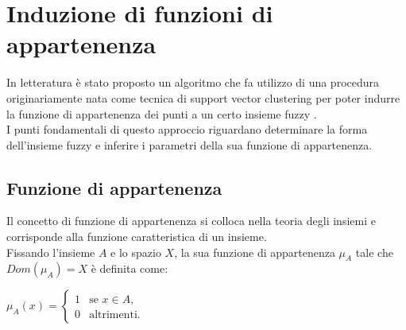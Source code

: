 \documentclass[12pt]{report}
\theoremstyle{definition}
\begin{document}
\section{Induzione di funzioni di appartenenza} \label{induzione}
In letteratura è stato proposto un algoritmo che fa utilizzo di una procedura originariamente nata come tecnica di support vector clustering \cite{23} per poter indurre la funzione di appartenenza dei punti a un certo insieme fuzzy \cite{1}.
\\
I punti fondamentali di questo approccio riguardano determinare la forma dell'insieme fuzzy e inferire i parametri della sua funzione di appartenenza.

\subsection{Funzione di appartenenza} \label{membership}
Il concetto di funzione di appartenenza si colloca nella teoria degli insiemi e corrisponde alla funzione caratteristica di un insieme.
\\
Fissando l'insieme $A$ e lo spazio $X$, la sua funzione di appartenenza $\mu_A$ tale che $Dom(\mu_A) = X$ è definita come:
\begin{center}
    $\mu_A(x)= \begin{cases} 1 & \mbox{se } x \in A, \\ 0 & \mbox{altrimenti.} \end{cases}$
\end{center}
\end{document}
